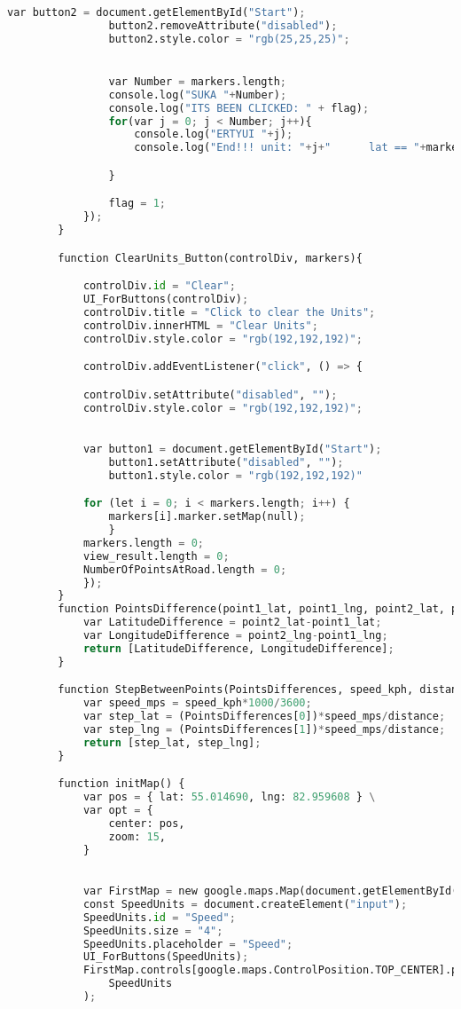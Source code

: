 \documentclass[a4paper]{article}
\begin{document}
\begin{lstlisting}[language=python,tabsize = 1,breaklines=true, breakatwhitespace=false,frame=single]
				var button2 = document.getElementById("Start");
				button2.removeAttribute("disabled");
				button2.style.color = "rgb(25,25,25)";


				var Number = markers.length;
				console.log("SUKA "+Number);
				console.log("ITS BEEN CLICKED: " + flag);
				for(var j = 0; j < Number; j++){
					console.log("ERTYUI "+j);
					console.log("End!!! unit: "+j+"      lat == "+markers[j].marker.getPosition().lat()+" lng == "+markers[j].marker.getPosition().lng());

				}

				flag = 1;
			});
		}

		function ClearUnits_Button(controlDiv, markers){

			controlDiv.id = "Clear";
			UI_ForButtons(controlDiv);
			controlDiv.title = "Click to clear the Units";
			controlDiv.innerHTML = "Clear Units";
			controlDiv.style.color = "rgb(192,192,192)";

			controlDiv.addEventListener("click", () => {

			controlDiv.setAttribute("disabled", "");
			controlDiv.style.color = "rgb(192,192,192)";

			
			var button1 = document.getElementById("Start");
				button1.setAttribute("disabled", "");
				button1.style.color = "rgb(192,192,192)"

			for (let i = 0; i < markers.length; i++) {
				markers[i].marker.setMap(null);
				}
			markers.length = 0;
			view_result.length = 0;
			NumberOfPointsAtRoad.length = 0;
			});
		}
		function PointsDifference(point1_lat, point1_lng, point2_lat, point2_lng){
			var LatitudeDifference = point2_lat-point1_lat;
			var LongitudeDifference = point2_lng-point1_lng;
			return [LatitudeDifference, LongitudeDifference];
		}

		function StepBetweenPoints(PointsDifferences, speed_kph, distance){
			var speed_mps = speed_kph*1000/3600;
			var step_lat = (PointsDifferences[0])*speed_mps/distance;
			var step_lng = (PointsDifferences[1])*speed_mps/distance;
			return [step_lat, step_lng];
		}

		function initMap() {
			var pos = { lat: 55.014690, lng: 82.959608 } \
			var opt = {
				center: pos,
				zoom: 15,
			}

			
			var FirstMap = new google.maps.Map(document.getElementById("map"), opt);
			const SpeedUnits = document.createElement("input");
			SpeedUnits.id = "Speed";
			SpeedUnits.size = "4";
			SpeedUnits.placeholder = "Speed";
			UI_ForButtons(SpeedUnits);
			FirstMap.controls[google.maps.ControlPosition.TOP_CENTER].push(
				SpeedUnits
			);


\end{lstlisting}
\end{document}

